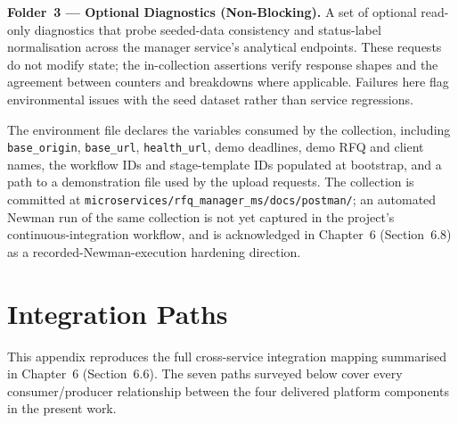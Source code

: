 \textbf{Folder~3 --- Optional Diagnostics (Non-Blocking).} A set of optional read-only diagnostics that probe seeded-data consistency and status-label normalisation across the manager service's analytical endpoints. These requests do not modify state; the in-collection assertions verify response shapes and the agreement between counters and breakdowns where applicable. Failures here flag environmental issues with the seed dataset rather than service regressions.

The environment file declares the variables consumed by the collection, including \texttt{base\_origin}, \texttt{base\_url}, \texttt{health\_url}, demo deadlines, demo RFQ and client names, the workflow IDs and stage-template IDs populated at bootstrap, and a path to a demonstration file used by the upload requests. The collection is committed at \texttt{microservices/rfq\_manager\_ms/docs/postman/}; an automated Newman run of the same collection is not yet captured in the project's continuous-integration workflow, and is acknowledged in Chapter~6 (Section~6.8) as a recorded-Newman-execution hardening direction.

\section{Integration Paths}
\label{app:integration}

This appendix reproduces the full cross-service integration mapping summarised in Chapter~6 (Section~6.6). The seven paths surveyed below cover every consumer/producer relationship between the four delivered platform components in the present work.

